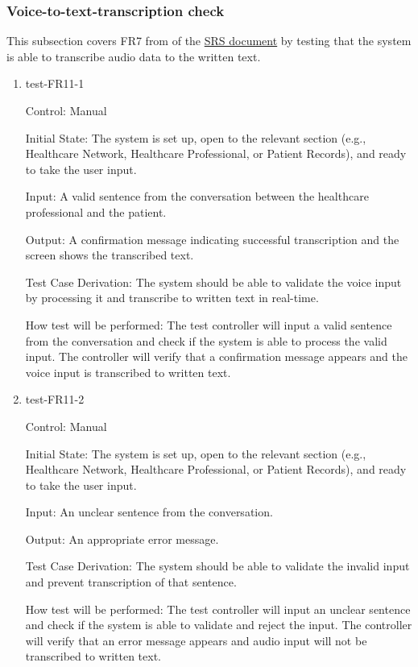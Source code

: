 \documentclass[12pt, titlepage]{article}
\begin{document}
\subsubsection{Voice-to-text-transcription check} \label{section:4.1.5}

This subsection covers FR7 from of the \href{https://github.com/Inreet-Kaur/capstone/blob/main/docs/SRS/SRS.pdf} {SRS document} by testing that the system is able to transcribe audio data to the written text.

\begin{enumerate}

\item{test-FR11-1} \label{test-FR11-1}

Control: Manual

Initial State: The system is set up, open to the relevant section (e.g., Healthcare Network, Healthcare Professional, or Patient Records), and ready to take the user input.

Input: A valid sentence from the conversation between the healthcare professional and the patient.

Output: A confirmation message indicating successful transcription and the screen shows the transcribed text.

Test Case Derivation: The system should be able to validate the voice input by processing it and transcribe to written text in real-time.

How test will be performed: The test controller will input a valid sentence from the conversation and check if the system is able to process the valid input. The controller will verify that a confirmation message appears and the voice input is transcribed to written text.


\item{test-FR11-2} \label{test-FR11-2}

Control: Manual

Initial State: The system is set up, open to the relevant section (e.g., Healthcare Network, Healthcare Professional, or Patient Records), and ready to take the user input.

Input: An unclear sentence from the conversation.

Output: An appropriate error message.

Test Case Derivation: The system should be able to validate the invalid input and prevent transcription of that sentence.

How test will be performed: The test controller will input an unclear sentence and check if the system is able to validate and reject the input. The controller will verify that an error message appears and audio input will not be transcribed to written text.

\end{enumerate}
\end{document}
